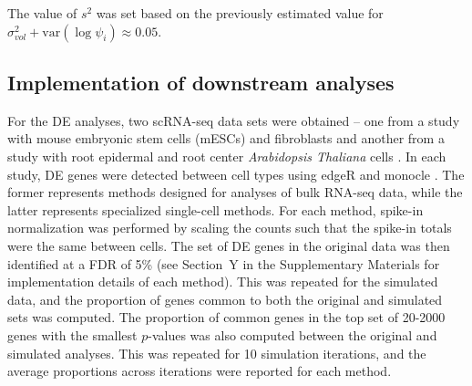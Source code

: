 \documentclass{article}
\begin{document}

The value of $s^2$ was set based on the previously estimated value for $\sigma^2_{vol} + \mbox{var}(\log \psi_{i}) \approx 0.05$.

\subsection{Implementation of downstream analyses}
For the DE analyses, two scRNA-seq data sets were obtained -- one from a study with mouse embryonic stem cells (mESCs) and fibroblasts \cite{islam2011characterization} and another from a study with root epidermal and root center \textit{Arabidopsis Thaliana} cells \cite{brennecke2013accounting}.
In each study, DE genes were detected between cell types using edgeR \cite{robinson2010edgeR,lund2012detecting} and monocle \cite{trapnell2014dynamics}.
The former represents methods designed for analyses of bulk RNA-seq data, while the latter represents specialized single-cell methods.
For each method, spike-in normalization was performed by scaling the counts such that the spike-in totals were the same between cells.
The set of DE genes in the original data was then identified at a FDR of 5\% (see Section~Y in the Supplementary Materials for implementation details of each method).
This was repeated for the simulated data, and the proportion of genes common to both the original and simulated sets was computed.
The proportion of common genes in the top set of 20-2000 genes with the smallest $p$-values was also computed between the original and simulated analyses.
This was repeated for 10 simulation iterations, and the average proportions across iterations were reported for each method.
\end{document}
